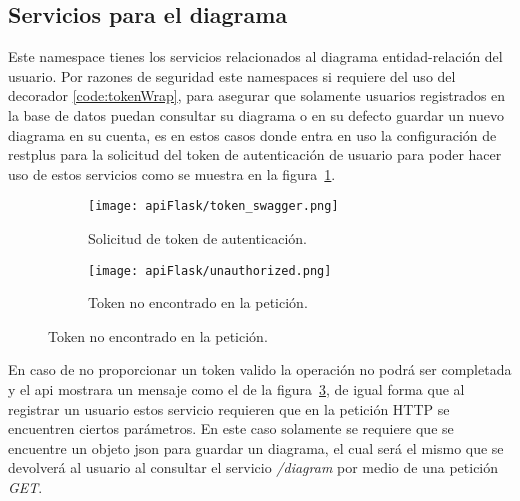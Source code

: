 \subsection{Servicios para el diagrama}

Este namespace tienes los servicios relacionados al diagrama entidad-relación del usuario. Por razones de seguridad este namespaces si requiere del uso del decorador \ref{code:tokenWrap}, para asegurar que solamente usuarios registrados en la base de datos puedan consultar su diagrama o en su defecto guardar un nuevo diagrama en su cuenta, es en estos casos donde entra en uso la configuración de restplus para la solicitud del token de autenticación de usuario para poder hacer uso de estos servicios como se muestra en la figura~\ref{img:tokenSwagger}.

\begin{figure}[H]
  \begin{subfigure}[b]{0.49\textwidth}
      \texttt{[image: apiFlask/token\_swagger.png]}
      \caption{Solicitud de token de autenticación.}
      \label{img:tokenSwagger}
    \end{subfigure}
    \hfill
    \begin{subfigure}[b]{0.49\textwidth}
      \texttt{[image: apiFlask/unauthorized.png]}
      \caption{Token no encontrado en la petición.}
      \label{img:unauthorized}
    \end{subfigure}
\end{figure}

En caso de no proporcionar un token valido la operación no podrá ser completada y el api mostrara un mensaje como el de la figura~\ref{img:unauthorized}, de igual forma que al registrar un usuario estos servicio requieren que en la petición HTTP se encuentren ciertos parámetros. En este caso solamente se requiere que se encuentre un objeto json para guardar un diagrama, el cual será el mismo que se devolverá al usuario al consultar el servicio \textit{/diagram} por medio de una petición \textit{GET}.